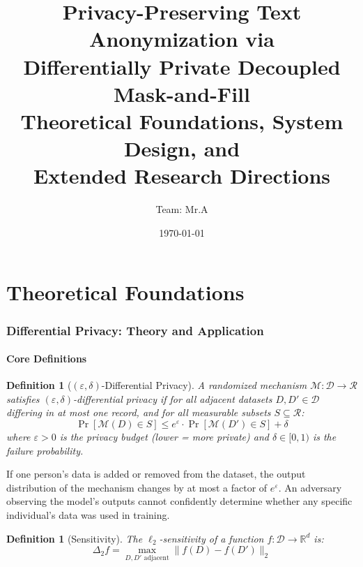 \documentclass[11pt, a4paper]{article}
\title{
  \textbf{Privacy-Preserving Text Anonymization via\\
  Differentially Private Decoupled Mask-and-Fill}\\[0.5em]
  \Large Theoretical Foundations, System Design, and\\
  Extended Research Directions
}
\author{Team: Mr.A}
\date{\today}
\newtheorem{definition}[theorem]{Definition}
\newcommand{\eps}{\varepsilon}
\newcommand{\R}{\mathbb{R}}
\begin{document}
\maketitle
\tableofcontents
\newpage

\part{Theoretical Foundations}

\section{Differential Privacy: Theory and Application}

\subsection{Core Definitions}

\begin{definition}[$(\eps, \delta)$-Differential Privacy]
A randomized mechanism $\mathcal{M}: \mathcal{D} \rightarrow \mathcal{R}$ satisfies $(\eps, \delta)$-differential privacy if for all adjacent datasets $D, D' \in \mathcal{D}$ differing in at most one record, and for all measurable subsets $S \subseteq \mathcal{R}$:
\begin{equation}
\Pr[\mathcal{M}(D) \in S] \leq e^{\eps} \cdot \Pr[\mathcal{M}(D') \in S] + \delta
\end{equation}
where $\eps > 0$ is the privacy budget (lower = more private) and $\delta \in [0,1)$ is the failure probability.
\end{definition}

\begin{keyresult}[Intuition]
If one person's data is added or removed from the dataset, the output distribution of the mechanism changes by at most a factor of $e^{\eps}$. An adversary observing the model's outputs cannot confidently determine whether any specific individual's data was used in training.
\end{keyresult}

\begin{definition}[Sensitivity]
The $\ell_2$-sensitivity of a function $f: \mathcal{D} \rightarrow \R^d$ is:
\begin{equation}
\Delta_2 f = \max_{D, D' \text{ adjacent}} \|f(D) - f(D')\|_2
\end{equation}
\end{definition}
\end{document}
